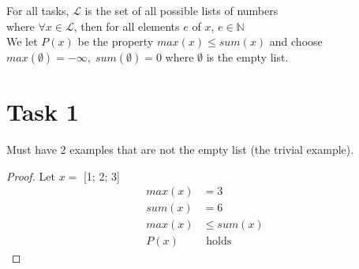 \documentclass{article}
\begin{document}
	For all tasks, $\mathcal{L}$ is the set of all possible lists of numbers \\
	where $\forall x \in \mathcal{L}$, then for all elements $e$ of $x$, $e \in  \mathbb{N}$ \\ 
	We let $P(x)$ be the property $max(x) \leq sum(x)$ and choose \\
	$max(\emptyset) = -\infty, \;sum(\emptyset) = 0$ where $\emptyset$ is the empty list.
	
	\section{Task 1}
	
	Must have 2 examples that are not the empty list (the trivial example). 
	
	\begin{proof}
		Let $x = $ 
		[1; 2; 3]
		\begin{align*}
			max(x) &= 3 \\
			sum(x) &= 6 \\
			max(x) &\leq sum(x) \\ 
			P(x) &\text{  holds} 
		\end{align*}
	\end{proof}
	
	
	\newpage
	
\end{document}
